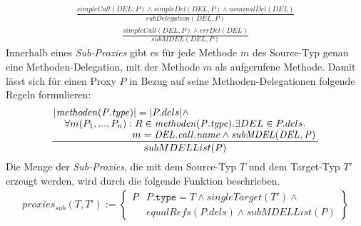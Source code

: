 \documentclass[a4paper,12pt]{article}
\begin{document}
\begin{gather*}
\frac{\mathit{simpleCall(DEL,P)} \wedge \mathit{simpleDel(DEL,P) \wedge \mathit{nominalDel(DEL)}}}
{subDelegation(DEL,P)}
\end{gather*}
\begin{gather*}
\frac{\mathit{simpleCall(DEL,P)}\wedge\mathit{errDel(DEL)}
}
{subMDEL(DEL,P)}
\end{gather*}
Innerhalb eines \emph{Sub-Proxies} gibt es für jede Methode $m$ des Source-Typ genau eine Methoden-Delegation, mit der Methode $m$ als aufgerufene Methode. Damit lässt sich für einen Proxy $P$ in Bezug auf seine Methoden-Delegationen folgende Regeln formulieren:
\begin{gather*}
\frac{\splitfrac{|\mathit{methoden(P.type)}| = |P.dels| \wedge}{ \splitfrac{\forall m(P_1,...,P_n):R \in \mathit{methoden(P.type)}.\exists DEL \in P.dels.}{m = \mathit{DEL.call.name} \wedge \mathit{subMDEL(DEL,P)}
 }}
}
{subMDELList(P)}
\end{gather*}
Die Menge der \emph{Sub-Proxies}, die mit dem Source-Typ $T$ und dem Target-Typ $T'$ erzeugt werden, wird durch die folgende Funktion beschrieben.
\begin{gather*}
\mathit{proxies_{sub}(T,T')} := 
\left\{\begin{array}{l|l}
	P	& P\texttt{.type} = T \wedge  \mathit{singleTarget(T')} \wedge \mathit{ }\\
		& \mathit{equalRefs(P.dels)} \wedge \mathit{subMDELList(P)}
		 \end{array}
\right\}
\end{gather*}
\end{document}
